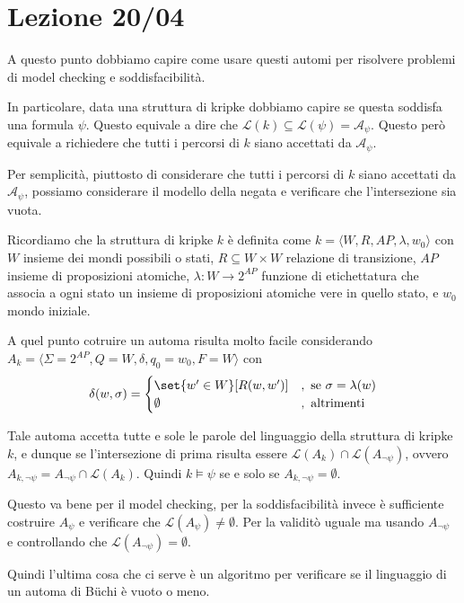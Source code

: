 \chapter{Lezione 20/04}

A questo punto dobbiamo capire come usare questi automi per risolvere problemi di model checking e soddisfacibilità.

In particolare, data una struttura di kripke dobbiamo capire se questa soddisfa una formula \(\psi\). Questo equivale a dire che
\(\mathcal{L}(k)\subseteq \mathcal{L}(\psi) = \mathcal{A_\psi}\). Questo però equivale a richiedere che tutti i percorsi di \(k\) siano accettati da \(\mathcal{A_\psi}\).

Per semplicità, piuttosto di considerare che tutti i percorsi di \(k\) siano accettati da \(\mathcal{A_\psi}\), possiamo considerare il modello della negata e verificare che l'intersezione sia vuota.

Ricordiamo che la struttura di kripke \(k\) è definita come \(k = \langle W, R, AP, \lambda, w_0\rangle\) con \(W\) insieme dei mondi possibili o stati, \(R \subseteq W\times W\) relazione di transizione, \(AP\) insieme di proposizioni atomiche, \(\lambda: W \to 2^{AP}\) funzione di etichettatura che associa a ogni stato un insieme di proposizioni atomiche vere in quello stato, e \(w_0\) mondo iniziale.

A quel punto cotruire un automa risulta molto facile considerando \(A_k = \langle \Sigma=2^{AP}, Q = W, \delta, q_0 = w_0,  F=W\rangle\) con
\[\delta(w,\sigma) = \begin{cases}
    \set{w' \in W}[R(w,w')] & , \text{ se } \sigma = \lambda(w) \\
    \emptyset               & , \text{ altrimenti}
  \end{cases}\]

Tale automa accetta tutte e sole le parole del linguaggio della struttura di kripke \(k\), e dunque se l'intersezione di prima risulta essere \(\mathcal{L}(A_k) \cap \mathcal{L}(A_{\neg\psi})\), ovvero \(A_{k,\neg\psi} = A_{\neg\psi} \cap \mathcal{L}(A_k)\).
Quindi \(k\models \psi\) se e solo se \(A_{k,\neg\psi} = \emptyset\).

Questo va bene per il model checking, per la soddisfacibilità invece è sufficiente costruire \(A_\psi\) e verificare che \(\mathcal{L}(A_\psi)\neq \emptyset\). Per la validitò uguale ma usando \(A_{\neg\psi}\) e controllando che \(\mathcal{L}(A_{\neg\psi}) = \emptyset\).

Quindi l'ultima cosa che ci serve è un algoritmo per verificare se il linguaggio di un automa di Büchi è vuoto o meno.

